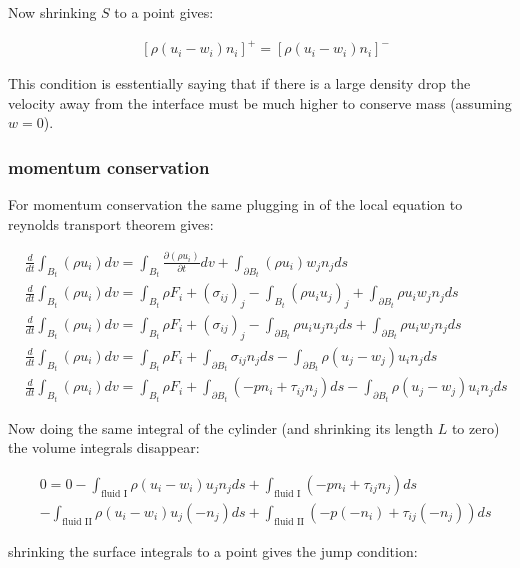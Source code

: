 \documentclass[a4paper,12pt]{article}
\newcommand{\pd}[2]{\frac{\partial #1}{\partial #2}}
\begin{document}
Now shrinking $S$ to a point gives:

\begin{align}
  &[\rho (u_i - w_i) n_i]^+ = [\rho (u_i - w_i) n_i]^-
\end{align}

This condition is esstentially saying that if there is a large density drop the velocity away from the interface must be much higher to conserve mass (assuming $w = 0$).

\subsubsection{momentum conservation}

For momentum conservation the same plugging in of the local equation to reynolds transport theorem gives:

\begin{align}
  &\frac{d}{dt}\int_{B_t} (\rho u_i) dv = \int_{B_t} \pd{(\rho u_i)}{t}dv + \int_{\partial B_t} (\rho u_i) w_j n_j ds\\
  &\frac{d}{dt}\int_{B_t} (\rho u_i) dv = \int_{B_t} \rho F_i + (\sigma_{ij})_j - \int_{B_t} (\rho u_i u_j)_j + \int_{\partial B_t} \rho u_i w_j n_j ds\\
  &\frac{d}{dt}\int_{B_t} (\rho u_i) dv = \int_{B_t} \rho F_i + (\sigma_{ij})_j - \int_{\partial B_t} \rho u_i u_j n_j ds + \int_{\partial B_t} \rho u_i w_j n_j ds\\
  &\frac{d}{dt}\int_{B_t} (\rho u_i) dv = \int_{B_t} \rho F_i + \int_{\partial B_t}\sigma_{ij}n_j ds - \int_{\partial B_t} \rho (u_j - w_j) u_i n_j ds\\
  &\frac{d}{dt}\int_{B_t} (\rho u_i) dv = \int_{B_t} \rho F_i + \int_{\partial B_t}(-pn_i + \tau_{ij}n_j) ds - \int_{\partial B_t} \rho (u_j - w_j) u_i n_j ds \label{eq:momentum-interface-derivation}
\end{align}

Now doing the same integral of the cylinder (and shrinking its length $L$ to zero) the volume integrals disappear:

\begin{align}
  & 0 = 0 - \int_{\text{fluid I}}  \rho (u_i - w_i) u_j n_j ds + \int_{\text{fluid I}}  (-pn_i + \tau_{ij}n_j) ds\\
  &- \int_{\text{fluid II}}  \rho (u_i - w_i) u_j (-n_j) ds + \int_{\text{fluid II}}  (-p(-n_i) + \tau_{ij}(-n_j)) ds
\end{align}

shrinking the surface integrals to a point gives the jump condition:
\end{document}
